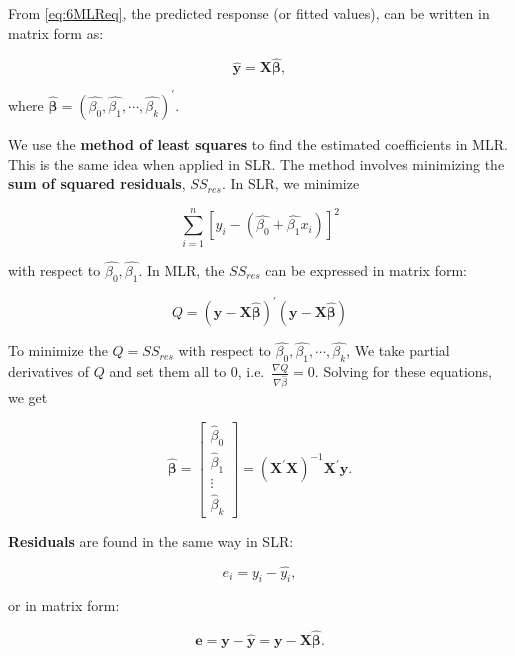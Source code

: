 \documentclass[
]{book}
\begin{document}
From \eqref{eq:6MLReq}, the predicted response (or fitted values), can be written in matrix form as:

\begin{equation} 
\boldsymbol{\hat{y}} = \boldsymbol{X\hat{\beta}},
\label{eq:6yhat}
\end{equation}

where \(\boldsymbol{\hat{\beta}} = (\hat{\beta_0}, \hat{\beta_1}, \cdots, \hat{\beta_k})^\prime\).

We use the \textbf{method of least squares} to find the estimated coefficients in MLR. This is the same idea when applied in SLR. The method involves minimizing the \textbf{sum of squared residuals}, \(SS_{res}\). In SLR, we minimize

\[
\sum\limits_{i=1}^{n} \left[ y_i - (\hat{\beta_0}+\hat{\beta_1} x_i) \right]^{2}
\]

with respect to \(\hat{\beta_0}, \hat{\beta_1}\). In MLR, the \(SS_{res}\) can be expressed in matrix form:

\begin{equation}
Q = \left(\boldsymbol{y - X\hat{\beta}}\right)^{\prime} \left(\boldsymbol{y - X\hat{\beta}}\right)
\label{eq:6min}
\end{equation}

To minimize the \(Q = SS_{res}\) with respect to \(\hat{\beta_0}, \hat{\beta_1}, \cdots, \hat{\beta_k}\), We take partial derivatives of \(Q\) and set them all to 0, i.e.~\(\frac{\nabla Q}{\nabla \hat{\beta}}=0\). Solving for these equations, we get

\begin{equation} 
\boldsymbol{\hat{\beta}} = \left[
\begin{array}{c}
   \hat{\beta}_0  \\
   \hat{\beta}_1 \\
   \vdots \\
   \hat{\beta}_k
\end{array}
\right]  =
\left(\boldsymbol{X}^{\prime} \boldsymbol{X} \right)^{-1} \boldsymbol{X}^{\prime} \boldsymbol{y} .
\label{eq:6b}
\end{equation}

\textbf{Residuals} are found in the same way in SLR:

\[
e_i = y_i - \hat{y_i},
\]

or in matrix form:

\begin{equation} 
\boldsymbol{e} = \boldsymbol{y} - \boldsymbol{\hat{y}} = \boldsymbol{y} - \boldsymbol{X\hat{\beta}}.
\label{eq:6res}
\end{equation}
\end{document}
